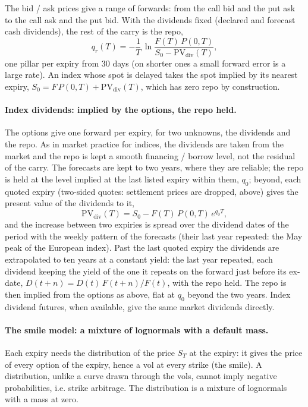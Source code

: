 The bid / ask prices give a range of forwards: from the call bid and the put ask to the call ask and the put bid.
With the dividends fixed (declared and forecast cash dividends), the rest of the carry is the repo,
\[
  q_r(T) = -\frac{1}{T}\,\ln\frac{F(T)\,P(0,T)}{S_0 - \mathrm{PV}_{\mathrm{div}}(T)},
\]
one pillar per expiry from 30 days (on shorter ones a small forward error is a large rate). An index whose spot is
delayed takes the spot implied by its nearest expiry, $S_0 = F\,P(0,T) + \mathrm{PV}_{\mathrm{div}}(T)$, which has zero
repo by construction.

\paragraph{Index dividends: implied by the options, the repo held.} The options give one forward per expiry, for
two unknowns, the dividends and the repo. As in market practice for indices, the dividends are taken from the market
and the repo is kept a smooth financing / borrow level, not the residual of the carry. The forecasts are kept to two
years, where they are reliable; the repo is held at the level implied at the last listed expiry within them, $q_0$;
beyond, each quoted expiry (two-sided quotes: settlement prices are dropped, above) gives the present value of the
dividends to it,
\[
  \mathrm{PV}_{\mathrm{div}}(T) = S_0 - F(T)\,P(0,T)\,e^{q_0 T},
\]
and the increase between two expiries is spread over the dividend dates of the period with the weekly pattern of the
forecasts (their last year repeated: the May peak of the European index). Past the last quoted expiry the dividends are
extrapolated to ten years at a constant yield: the last year repeated, each dividend keeping the yield of the one it
repeats on the forward just before its ex-date, $D(t + n) = D(t)\,F(t + n)/F(t)$, with the repo held. The repo is then
implied from the options as above, flat at $q_0$ beyond the two years. Index dividend futures, when available, give the
same market dividends directly.

\paragraph{The smile model: a mixture of lognormals with a default mass.} Each expiry needs the distribution of
the price $S_T$ at the expiry: it gives the price of every option of the expiry, hence a vol at every strike (the
smile). A distribution, unlike a curve drawn through the vols, cannot imply negative probabilities, i.e. strike
arbitrage. The distribution is a mixture of lognormals \citep{brigo2002} with a mass at zero.

